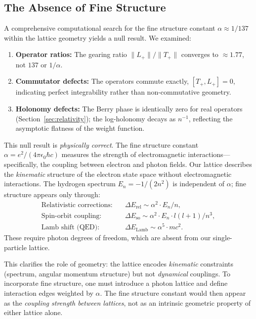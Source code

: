 \documentclass[aps,pra,twocolumn,superscriptaddress,longbibliography]{revtex4-2}
\begin{document}
\subsection{The Absence of Fine Structure}

A comprehensive computational search for the fine structure constant $\alpha \approx 1/137$ within the lattice geometry yields a null result. We examined:
\begin{enumerate}
\item \textbf{Operator ratios:} The gearing ratio $\|L_+\|/\|T_+\|$ converges to $\approx 1.77$, not $137$ or $1/\alpha$.
\item \textbf{Commutator defects:} The operators commute exactly, $[T_+, L_+] = 0$, indicating perfect integrability rather than non-commutative geometry.
\item \textbf{Holonomy defects:} The Berry phase is identically zero for real operators (Section~\ref{sec:relativity}); the log-holonomy decays as $n^{-1}$, reflecting the asymptotic flatness of the weight function.
\end{enumerate}

This null result is \textit{physically correct}. The fine structure constant $\alpha = e^2/(4\pi\epsilon_0 \hbar c)$ measures the strength of electromagnetic interactions---specifically, the coupling between electron and photon fields. Our lattice describes the \textit{kinematic} structure of the electron state space without electromagnetic interactions. The hydrogen spectrum $E_n = -1/(2n^2)$ is independent of $\alpha$; fine structure appears only through:
\begin{align}
\text{Relativistic corrections:} \quad & \Delta E_{\text{rel}} \sim \alpha^2 \cdot E_n / n, \\
\text{Spin-orbit coupling:} \quad & \Delta E_{\text{so}} \sim \alpha^2 \cdot E_n \cdot l(l+1) / n^3, \\
\text{Lamb shift (QED):} \quad & \Delta E_{\text{Lamb}} \sim \alpha^5 \cdot mc^2.
\end{align}
These require photon degrees of freedom, which are absent from our single-particle lattice.

This clarifies the role of geometry: the lattice encodes \textit{kinematic} constraints (spectrum, angular momentum structure) but not \textit{dynamical} couplings. To incorporate fine structure, one must introduce a photon lattice and define interaction edges weighted by $\alpha$. The fine structure constant would then appear as the \textit{coupling strength between lattices}, not as an intrinsic geometric property of either lattice alone.
\end{document}
